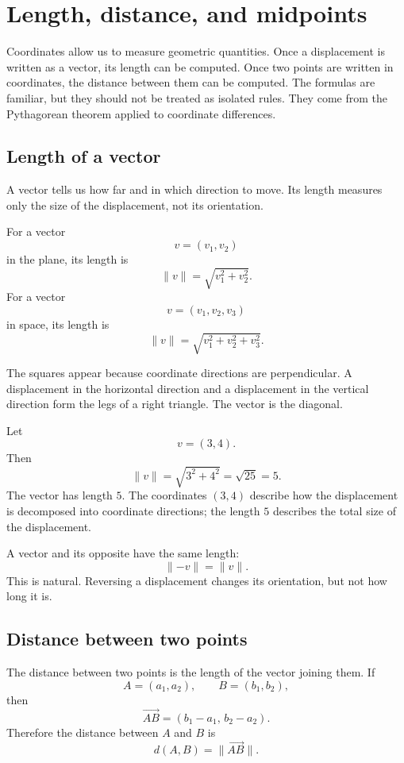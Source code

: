 \section{Length, distance, and midpoints}

Coordinates allow us to measure geometric quantities. Once a displacement is written as a vector, its length can be computed. Once two points are written in coordinates, the distance between them can be computed. The formulas are familiar, but they should not be treated as isolated rules. They come from the Pythagorean theorem applied to coordinate differences.

\subsection*{Length of a vector}

A vector tells us how far and in which direction to move. Its length measures only the size of the displacement, not its orientation.

\begin{definitionbox}
For a vector
\[
v=(v_1,v_2)
\]
in the plane, its length is
\[
\lVert v\rVert=\sqrt{v_1^2+v_2^2}.
\]
For a vector
\[
v=(v_1,v_2,v_3)
\]
in space, its length is
\[
\lVert v\rVert=\sqrt{v_1^2+v_2^2+v_3^2}.
\]
\end{definitionbox}

The squares appear because coordinate directions are perpendicular. A displacement in the horizontal direction and a displacement in the vertical direction form the legs of a right triangle. The vector is the diagonal.

\begin{examplebox}
Let
\[
v=(3,4).
\]
Then
\[
\lVert v\rVert=\sqrt{3^2+4^2}=\sqrt{25}=5.
\]
The vector has length \(5\). The coordinates \((3,4)\) describe how the displacement is decomposed into coordinate directions; the length \(5\) describes the total size of the displacement.
\end{examplebox}

A vector and its opposite have the same length:
\[
\lVert -v\rVert=\lVert v\rVert.
\]
This is natural. Reversing a displacement changes its orientation, but not how long it is.

\subsection*{Distance between two points}

The distance between two points is the length of the vector joining them. If
\[
A=(a_1,a_2),
\qquad
B=(b_1,b_2),
\]
then
\[
\overrightarrow{AB}=(b_1-a_1,\,b_2-a_2).
\]
Therefore the distance between \(A\) and \(B\) is
\[
d(A,B)=\lVert \overrightarrow{AB}\rVert.
\]

